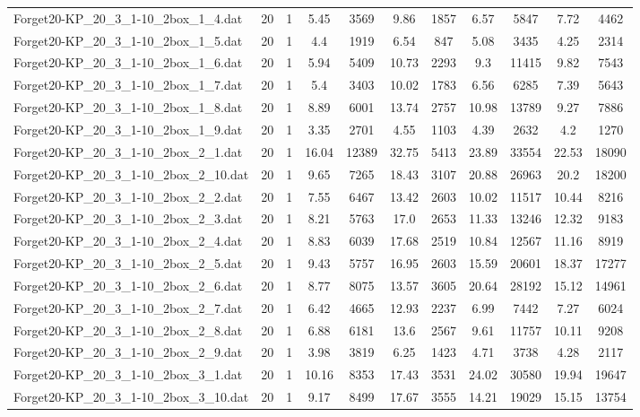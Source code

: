 \begin{table}[!ht]
\begin{tabular}{lcccccccccc}
Forget20-KP\_20\_3\_1-10\_2box\_1\_4.dat & 20 & 1 & 5.45 & 3569 & 9.86 & 1857 & 6.57 & 5847 & 7.72 & 4462 \\
Forget20-KP\_20\_3\_1-10\_2box\_1\_5.dat & 20 & 1 & 4.4 & 1919 & 6.54 & 847 & 5.08 & 3435 & 4.25 & 2314 \\
Forget20-KP\_20\_3\_1-10\_2box\_1\_6.dat & 20 & 1 & 5.94 & 5409 & 10.73 & 2293 & 9.3 & 11415 & 9.82 & 7543 \\
Forget20-KP\_20\_3\_1-10\_2box\_1\_7.dat & 20 & 1 & 5.4 & 3403 & 10.02 & 1783 & 6.56 & 6285 & 7.39 & 5643 \\
Forget20-KP\_20\_3\_1-10\_2box\_1\_8.dat & 20 & 1 & 8.89 & 6001 & 13.74 & 2757 & 10.98 & 13789 & 9.27 & 7886 \\
Forget20-KP\_20\_3\_1-10\_2box\_1\_9.dat & 20 & 1 & 3.35 & 2701 & 4.55 & 1103 & 4.39 & 2632 & 4.2 & 1270 \\
Forget20-KP\_20\_3\_1-10\_2box\_2\_1.dat & 20 & 1 & 16.04 & 12389 & 32.75 & 5413 & 23.89 & 33554 & 22.53 & 18090 \\
Forget20-KP\_20\_3\_1-10\_2box\_2\_10.dat & 20 & 1 & 9.65 & 7265 & 18.43 & 3107 & 20.88 & 26963 & 20.2 & 18200 \\
Forget20-KP\_20\_3\_1-10\_2box\_2\_2.dat & 20 & 1 & 7.55 & 6467 & 13.42 & 2603 & 10.02 & 11517 & 10.44 & 8216 \\
Forget20-KP\_20\_3\_1-10\_2box\_2\_3.dat & 20 & 1 & 8.21 & 5763 & 17.0 & 2653 & 11.33 & 13246 & 12.32 & 9183 \\
Forget20-KP\_20\_3\_1-10\_2box\_2\_4.dat & 20 & 1 & 8.83 & 6039 & 17.68 & 2519 & 10.84 & 12567 & 11.16 & 8919 \\
Forget20-KP\_20\_3\_1-10\_2box\_2\_5.dat & 20 & 1 & 9.43 & 5757 & 16.95 & 2603 & 15.59 & 20601 & 18.37 & 17277 \\
Forget20-KP\_20\_3\_1-10\_2box\_2\_6.dat & 20 & 1 & 8.77 & 8075 & 13.57 & 3605 & 20.64 & 28192 & 15.12 & 14961 \\
Forget20-KP\_20\_3\_1-10\_2box\_2\_7.dat & 20 & 1 & 6.42 & 4665 & 12.93 & 2237 & 6.99 & 7442 & 7.27 & 6024 \\
Forget20-KP\_20\_3\_1-10\_2box\_2\_8.dat & 20 & 1 & 6.88 & 6181 & 13.6 & 2567 & 9.61 & 11757 & 10.11 & 9208 \\
Forget20-KP\_20\_3\_1-10\_2box\_2\_9.dat & 20 & 1 & 3.98 & 3819 & 6.25 & 1423 & 4.71 & 3738 & 4.28 & 2117 \\
Forget20-KP\_20\_3\_1-10\_2box\_3\_1.dat & 20 & 1 & 10.16 & 8353 & 17.43 & 3531 & 24.02 & 30580 & 19.94 & 19647 \\
Forget20-KP\_20\_3\_1-10\_2box\_3\_10.dat & 20 & 1 & 9.17 & 8499 & 17.67 & 3555 & 14.21 & 19029 & 15.15 & 13754 \\

\end{tabular}
\end{table}
